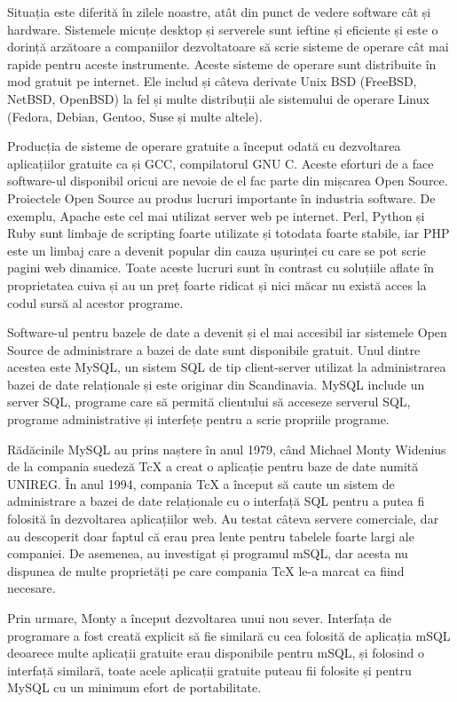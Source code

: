 \documentclass[12pt]{book}
\begin{document}
Situația este diferită în zilele noastre, atât din punct de vedere software cât și hardware. Sistemele micuțe desktop și serverele sunt ieftine și eficiente și este o dorință arzătoare a companiilor dezvoltatoare să scrie sisteme de operare cât mai rapide pentru aceste instrumente. Aceste sisteme de operare sunt distribuite în mod gratuit pe internet. Ele includ și câteva derivate Unix BSD (FreeBSD, NetBSD, OpenBSD) la fel și multe distribuții ale sistemului de operare Linux (Fedora, Debian, Gentoo, Suse și multe altele). \cite{mySqlDeveloperLibrary}

Producția de sisteme de operare gratuite a început odată cu dezvoltarea aplicațiilor gratuite ca și GCC, compilatorul GNU C. Aceste eforturi de a face software-ul disponibil oricui are nevoie de el fac parte din mișcarea Open Source. Proiectele Open Source au produs lucruri importante în industria software. De exemplu, Apache este cel mai utilizat server web pe internet. Perl, Python și Ruby sunt limbaje de scripting foarte utilizate și totodata foarte stabile, iar PHP este un limbaj care a devenit popular din cauza ușurinței cu care se pot scrie pagini web dinamice. Toate aceste lucruri sunt în contrast cu soluțiile aflate în proprietatea cuiva și au un preț foarte ridicat și nici măcar nu există acces la codul sursă al acestor programe.

Software-ul pentru bazele de date a devenit și el mai accesibil iar sistemele Open Source de administrare a bazei de date sunt disponibile gratuit. Unul dintre acestea este MySQL, un sistem SQL de tip client-server utilizat la administrarea bazei de date relaționale și este originar din Scandinavia. MySQL include un server SQL, programe care să permită clientului să acceseze serverul SQL, programe administrative și interfețe pentru a scrie propriile programe.\cite{mySqlDeveloperLibrary}

Rădăcinile MySQL au prins naștere în anul 1979, când Michael Monty Widenius de la compania suedeză TcX a creat o aplicație pentru baze de date numită UNIREG. În anul 1994, compania TcX a început să caute un sistem de administrare a bazei de date relaționale cu o interfață SQL pentru a putea fi folosită în dezvoltarea aplicațiilor web. Au testat câteva servere comerciale, dar au descoperit doar faptul că erau prea lente  pentru tabelele foarte largi ale companiei. De asemenea, au investigat și programul mSQL, dar acesta nu dispunea de multe proprietăți pe care compania TcX le-a marcat ca fiind necesare. 

Prin urmare, Monty a început dezvoltarea unui nou sever. Interfața de programare a fost creată explicit să fie similară cu cea folosită de aplicația mSQL deoarece multe aplicații gratuite erau disponibile pentru mSQL, și folosind o interfață similară, toate acele aplicații gratuite puteau fii folosite și pentru MySQL cu un minimum efort de portabilitate. 
\end{document}
